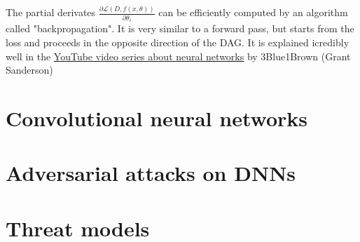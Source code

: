 The partial derivates $\frac{\partial \mathcal{L}(D, f(x, \theta))}{\partial \theta_i}$ can be efficiently computed by an algorithm called "backpropagation". It is very similar to a forward pass, but starts from the loss and proceeds in the opposite direction of the DAG. It is explained icredibly well in the \href{https://www.youtube.com/playlist?list=PLZHQObOWTQDNU6R1_67000Dx_ZCJB-3pi}{YouTube video series about neural networks} by 3Blue1Brown (Grant Sanderson)

\section{Convolutional neural networks}

\section{Adversarial attacks on DNNs}

\section{Threat models}